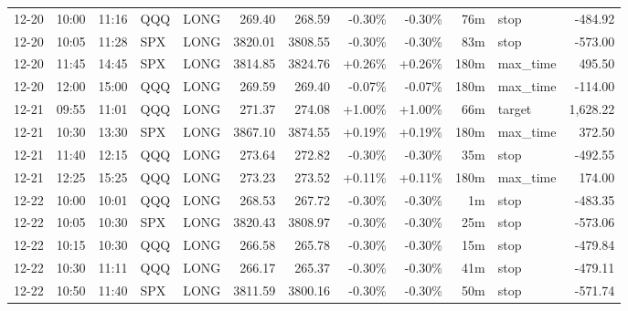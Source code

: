 \documentclass[11pt,a4paper,twoside]{article}
\begin{document}
\begin{center}
\begin{longtable}{>{\color{txtmain}}l l l l l r r r r r >{\color{txtmain}}l r}
12-20 & 10:00 & 11:16 & QQQ & LONG & 269.40 & 268.59 & \textcolor{lossred}{-0.30\%} & \textcolor{lossred}{-0.30\%} & 76m & stop & \textcolor{lossred}{-484.92} \\
12-20 & 10:05 & 11:28 & SPX & LONG & 3820.01 & 3808.55 & \textcolor{lossred}{-0.30\%} & \textcolor{lossred}{-0.30\%} & 83m & stop & \textcolor{lossred}{-573.00} \\
12-20 & 11:45 & 14:45 & SPX & LONG & 3814.85 & 3824.76 & \textcolor{wingreen}{+0.26\%} & \textcolor{wingreen}{+0.26\%} & 180m & max\_time & \textcolor{wingreen}{495.50} \\
12-20 & 12:00 & 15:00 & QQQ & LONG & 269.59 & 269.40 & \textcolor{lossred}{-0.07\%} & \textcolor{lossred}{-0.07\%} & 180m & max\_time & \textcolor{lossred}{-114.00} \\
12-21 & 09:55 & 11:01 & QQQ & LONG & 271.37 & 274.08 & \textcolor{wingreen}{+1.00\%} & \textcolor{wingreen}{+1.00\%} & 66m & target & \textcolor{wingreen}{1,628.22} \\
12-21 & 10:30 & 13:30 & SPX & LONG & 3867.10 & 3874.55 & \textcolor{wingreen}{+0.19\%} & \textcolor{wingreen}{+0.19\%} & 180m & max\_time & \textcolor{wingreen}{372.50} \\
12-21 & 11:40 & 12:15 & QQQ & LONG & 273.64 & 272.82 & \textcolor{lossred}{-0.30\%} & \textcolor{lossred}{-0.30\%} & 35m & stop & \textcolor{lossred}{-492.55} \\
12-21 & 12:25 & 15:25 & QQQ & LONG & 273.23 & 273.52 & \textcolor{wingreen}{+0.11\%} & \textcolor{wingreen}{+0.11\%} & 180m & max\_time & \textcolor{wingreen}{174.00} \\
12-22 & 10:00 & 10:01 & QQQ & LONG & 268.53 & 267.72 & \textcolor{lossred}{-0.30\%} & \textcolor{lossred}{-0.30\%} & 1m & stop & \textcolor{lossred}{-483.35} \\
12-22 & 10:05 & 10:30 & SPX & LONG & 3820.43 & 3808.97 & \textcolor{lossred}{-0.30\%} & \textcolor{lossred}{-0.30\%} & 25m & stop & \textcolor{lossred}{-573.06} \\
12-22 & 10:15 & 10:30 & QQQ & LONG & 266.58 & 265.78 & \textcolor{lossred}{-0.30\%} & \textcolor{lossred}{-0.30\%} & 15m & stop & \textcolor{lossred}{-479.84} \\
12-22 & 10:30 & 11:11 & QQQ & LONG & 266.17 & 265.37 & \textcolor{lossred}{-0.30\%} & \textcolor{lossred}{-0.30\%} & 41m & stop & \textcolor{lossred}{-479.11} \\
12-22 & 10:50 & 11:40 & SPX & LONG & 3811.59 & 3800.16 & \textcolor{lossred}{-0.30\%} & \textcolor{lossred}{-0.30\%} & 50m & stop & \textcolor{lossred}{-571.74} \\

\end{longtable}
\end{center}
\end{document}
